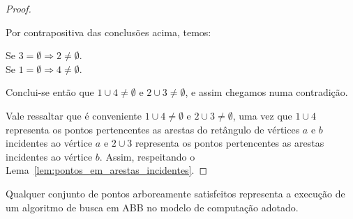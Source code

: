 \begin{proof}
\begin{figure}[H]
\begin{minipage}[t]{0.4\textwidth}
\begin{figure}[H]
\begin{adjustbox}{valign=t, raise=-25pt}
            \end{adjustbox}
            \label{fig:tikz-captions}
        \end{figure}
    \end{minipage}
    \vfill %
    \label{fig:chaves-buscas}
\end{figure}

Por contrapositiva das conclusões acima, temos:
\begin{center}
Se $3 = \emptyset \Rightarrow 2 \neq \emptyset$. \\
Se $1 = \emptyset \Rightarrow 4 \neq \emptyset$.
\end{center}

Conclui-se então que $1 \cup 4  \neq \emptyset$ e $2 \cup 3  \neq \emptyset$, e assim chegamos numa contradição.

Vale ressaltar que é conveniente $1 \cup 4  \neq \emptyset$ e $2 \cup 3  \neq \emptyset$, uma vez que $1 \cup 4$ representa os pontos pertencentes as arestas do retângulo de vértices $a$ e $b$ incidentes ao vértice $a$ e  $2 \cup 3$ representa os pontos pertencentes as arestas incidentes ao vértice $b$. Assim, respeitando o Lema~\ref{lem:pontos_em_arestas_incidentes}.
\end{proof}

\begin{lemma}Qualquer conjunto de pontos arboreamente satisfeitos representa a execução de um algoritmo de busca em ABB no modelo de computação adotado.
\end{lemma}


